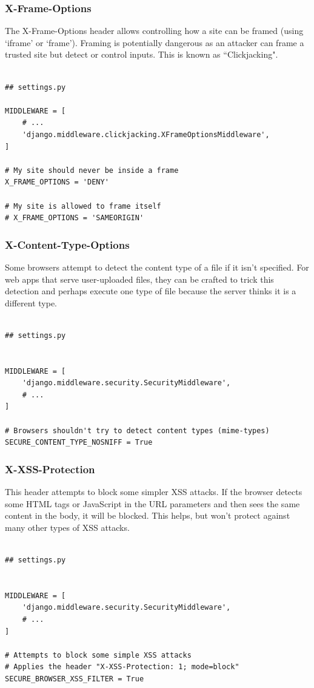 \documentclass[handout]{beamer}
\begin{document}
\begin{frame}[fragile]
\frametitle{X-Frame-Options}
{\tiny

The X-Frame-Options header allows controlling how a site can be framed (using `iframe' or `frame').
Framing is potentially dangerous as an attacker can frame a trusted site but detect or control inputs.
This is known as ``Clickjacking".

\vfill

\begin{verbatim}

## settings.py

MIDDLEWARE = [
    # ...
    'django.middleware.clickjacking.XFrameOptionsMiddleware',
]

# My site should never be inside a frame
X_FRAME_OPTIONS = 'DENY'

# My site is allowed to frame itself
# X_FRAME_OPTIONS = 'SAMEORIGIN'

\end{verbatim}
}
\end{frame}


\begin{frame}[fragile]
\frametitle{X-Content-Type-Options}
{\tiny

Some browsers attempt to detect the content type of a file if it isn't specified.
For web apps that serve user-uploaded files, they can be crafted to trick this detection
and perhaps execute one type of file because the server thinks it is a different type.

\vfill

\begin{verbatim}

## settings.py


MIDDLEWARE = [
    'django.middleware.security.SecurityMiddleware',
    # ...
]

# Browsers shouldn't try to detect content types (mime-types)
SECURE_CONTENT_TYPE_NOSNIFF = True

\end{verbatim}
}
\end{frame}


\begin{frame}[fragile]
\frametitle{X-XSS-Protection}
{\tiny

This header attempts to block some simpler XSS attacks.
If the browser detects some HTML tags or JavaScript in the URL parameters
and then sees the same content in the body, it will be blocked.
This helps, but won't protect against many other types of XSS attacks.

\vfill

\begin{verbatim}

## settings.py


MIDDLEWARE = [
    'django.middleware.security.SecurityMiddleware',
    # ...
]

# Attempts to block some simple XSS attacks
# Applies the header "X-XSS-Protection: 1; mode=block"
SECURE_BROWSER_XSS_FILTER = True

\end{verbatim}
}
\end{frame}
\end{document}
